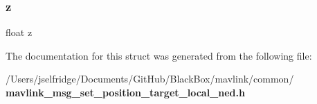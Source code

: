 \subsubsection{z}
{\footnotesize\ttfamily float z}



The documentation for this struct was generated from the following file\+:\begin{DoxyCompactItemize}
\item 
/\+Users/jselfridge/\+Documents/\+Git\+Hub/\+Black\+Box/mavlink/common/\textbf{ mavlink\+\_\+msg\+\_\+set\+\_\+position\+\_\+target\+\_\+local\+\_\+ned.\+h}\end{DoxyCompactItemize}
